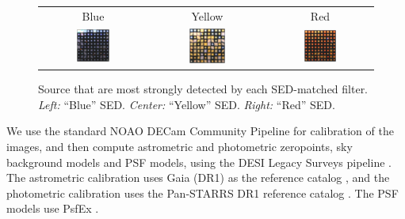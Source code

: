 \documentclass[letterpaper,preprint]{aastex62}
\begin{document}
\begin{figure}
  \begin{center}
    \begin{tabular}{@{}c@{}c@{}c@{}}
      Blue & Yellow & Red \\
      \includegraphics[width=0.33\textwidth]{best-blue} &
      \includegraphics[width=0.33\textwidth]{best-yellow} &
      \includegraphics[width=0.33\textwidth]{best-red}
    \end{tabular}
    \caption{Source that are most strongly detected by each
      SED-matched filter.  \emph{Left:} ``Blue'' SED.  \emph{Center:}
      ``Yellow'' SED.  \emph{Right:} ``Red'' SED.
    \label{fig:bestsed}}
  \end{center}
\end{figure}

We use the standard NOAO DECam Community Pipeline \citep{cppipeline}
for calibration of the images, and then compute astrometric and
photometric zeropoints, sky background models and PSF models, using
the DESI Legacy Surveys pipeline \citep{lsoverview}.  The astrometric
calibration uses Gaia (DR1) as the reference catalog \citep{gaia,
  gaiaDR1}, and the photometric calibration uses the Pan-STARRS DR1
reference catalog \citep{panstarrs}.  The PSF models use PsfEx
\citep{psfex}.
\end{document}
